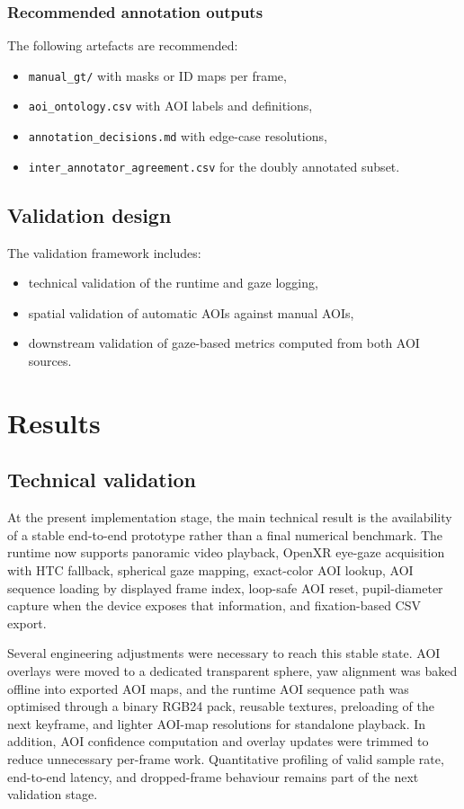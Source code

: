 \documentclass[11pt]{article}
\begin{document}
\subsubsection{Recommended annotation outputs}

The following artefacts are recommended:

\begin{itemize}
    \item \texttt{manual\_gt/} with masks or ID maps per frame,
    \item \texttt{aoi\_ontology.csv} with AOI labels and definitions,
    \item \texttt{annotation\_decisions.md} with edge-case resolutions,
    \item \texttt{inter\_annotator\_agreement.csv} for the doubly annotated subset.
\end{itemize}


\subsection{Validation design}
The validation framework includes:
\begin{itemize}[leftmargin=1.5em]
    \item technical validation of the runtime and gaze logging,
    \item spatial validation of automatic AOIs against manual AOIs,
    \item downstream validation of gaze-based metrics computed from both AOI sources.
\end{itemize}

\section{Results}

\subsection{Technical validation}
At the present implementation stage, the main technical result is the availability of a stable end-to-end prototype rather than a final numerical benchmark. The runtime now supports panoramic video playback, OpenXR eye-gaze acquisition with HTC fallback, spherical gaze mapping, exact-color AOI lookup, AOI sequence loading by displayed frame index, loop-safe AOI reset, pupil-diameter capture when the device exposes that information, and fixation-based CSV export.

Several engineering adjustments were necessary to reach this stable state. AOI overlays were moved to a dedicated transparent sphere, yaw alignment was baked offline into exported AOI maps, and the runtime AOI sequence path was optimised through a binary RGB24 pack, reusable textures, preloading of the next keyframe, and lighter AOI-map resolutions for standalone playback. In addition, AOI confidence computation and overlay updates were trimmed to reduce unnecessary per-frame work. Quantitative profiling of valid sample rate, end-to-end latency, and dropped-frame behaviour remains part of the next validation stage.
\end{document}
